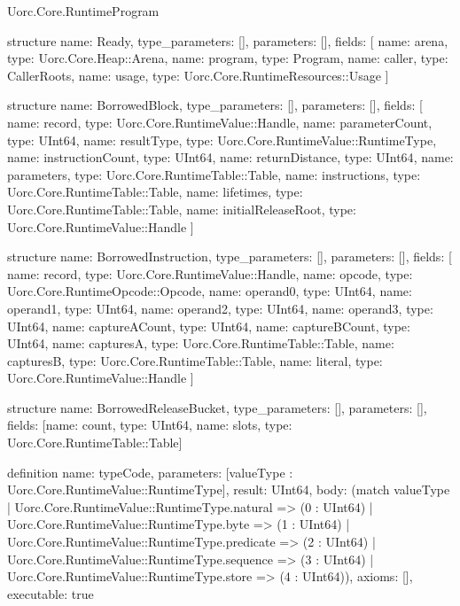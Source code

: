 \begin{lexlean}{Uorc.Core.RuntimeProgram}
\begin{semanticmodule}
structure{
  name: Ready,
  type_parameters: [],
  parameters: [],
  fields: [
    {name: arena, type: Uorc.Core.Heap::Arena},
    {name: program, type: Program},
    {name: caller, type: CallerRoots},
    {name: usage, type: Uorc.Core.RuntimeResources::Usage}
  ]
}

structure{
  name: BorrowedBlock,
  type_parameters: [],
  parameters: [],
  fields: [
    {name: record, type: Uorc.Core.RuntimeValue::Handle},
    {name: parameterCount, type: UInt64},
    {name: resultType, type: Uorc.Core.RuntimeValue::RuntimeType},
    {name: instructionCount, type: UInt64},
    {name: returnDistance, type: UInt64},
    {name: parameters, type: Uorc.Core.RuntimeTable::Table},
    {name: instructions, type: Uorc.Core.RuntimeTable::Table},
    {name: lifetimes, type: Uorc.Core.RuntimeTable::Table},
    {name: initialReleaseRoot, type: Uorc.Core.RuntimeValue::Handle}
  ]
}

structure{
  name: BorrowedInstruction,
  type_parameters: [],
  parameters: [],
  fields: [
    {name: record, type: Uorc.Core.RuntimeValue::Handle},
    {name: opcode, type: Uorc.Core.RuntimeOpcode::Opcode},
    {name: operand0, type: UInt64},
    {name: operand1, type: UInt64},
    {name: operand2, type: UInt64},
    {name: operand3, type: UInt64},
    {name: captureACount, type: UInt64},
    {name: captureBCount, type: UInt64},
    {name: capturesA, type: Uorc.Core.RuntimeTable::Table},
    {name: capturesB, type: Uorc.Core.RuntimeTable::Table},
    {name: literal, type: Uorc.Core.RuntimeValue::Handle}
  ]
}

structure{
  name: BorrowedReleaseBucket,
  type_parameters: [],
  parameters: [],
  fields: [{name: count, type: UInt64}, {name: slots, type: Uorc.Core.RuntimeTable::Table}]
}

definition{
  name: typeCode,
  parameters: [valueType : Uorc.Core.RuntimeValue::RuntimeType],
  result: UInt64,
  body: (match valueType
    | Uorc.Core.RuntimeValue::RuntimeType.natural => (0 : UInt64)
    | Uorc.Core.RuntimeValue::RuntimeType.byte => (1 : UInt64)
    | Uorc.Core.RuntimeValue::RuntimeType.predicate => (2 : UInt64)
    | Uorc.Core.RuntimeValue::RuntimeType.sequence => (3 : UInt64)
    | Uorc.Core.RuntimeValue::RuntimeType.store => (4 : UInt64)),
  axioms: [],
  executable: true
}


\end{semanticmodule}
\end{lexlean}
